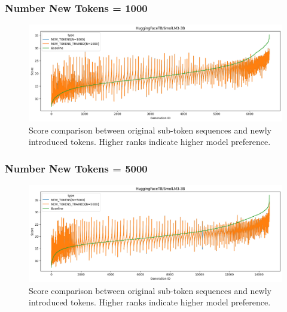 \subsubsection*{Number New Tokens = 1000}
\begin{figure}[H]
    \centering
    \includegraphics[width=\textwidth]{Figures/Appendix/token-rank-comparison_1000_smol3B.png}
    \caption{Score comparison between original sub-token sequences and newly introduced tokens. Higher ranks indicate higher model preference.}
    \label{fig:new_token_rank:1000_smol3B}
\end{figure}
\FloatBarrier

\subsubsection*{Number New Tokens = 5000}
\begin{figure}[H]
    \centering
    \includegraphics[width=\textwidth]{Figures/Appendix/token-rank-comparison_5000_smol3B.png}
    \caption{Score comparison between original sub-token sequences and newly introduced tokens. Higher ranks indicate higher model preference.}
    \label{fig:new_token_rank:5000_smol3B}
\end{figure}
\FloatBarrier

